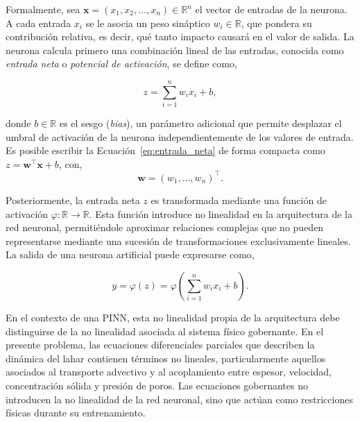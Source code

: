 Formalmente, sea $\mathbf{x} = (x_1, x_2, \dots, x_n) \in \mathbb{R}^n$ el vector de entradas de la neurona. A cada entrada $x_i$ se le asocia un peso sináptico $w_i \in \mathbb{R}$, que pondera su contribución relativa, es decir, qué tanto impacto causará
en el valor de salida. La neurona calcula primero una combinación lineal de las entradas, conocida como \textit{entrada neta} o \textit{potencial de activación}, se define como,

\begin{equation}
    z = \sum_{i=1}^{n} w_i x_i + b,
    \label{eq:entrada_neta}
\end{equation}

\noindent donde $b \in \mathbb{R}$ es el sesgo (\textit{bias}), un parámetro adicional que permite desplazar el umbral de activación de la neurona independientemente de los valores de entrada. Es posible escribir la Ecuación~\eqref{eq:entrada_neta} 
de forma compacta como $z = \mathbf{w}^{\top}\mathbf{x} + b$, con, 
\begin{equation}
    \mathbf{w} = (w_1, \dots, w_n)^{\top}.
    \label{eq:pesos}
\end{equation}

Posteriormente, la entrada neta $z$ es transformada mediante una función de activación $\varphi: \mathbb{R} \rightarrow \mathbb{R}$. Esta función introduce no linealidad en la arquitectura de la red neuronal, permitiéndole aproximar relaciones complejas 
que no pueden representarse mediante una sucesión de transformaciones exclusivamente lineales. La salida de una neurona artificial puede expresarse como,

\begin{equation}
    y = \varphi(z) = \varphi\left(\sum_{i=1}^{n} w_i x_i + b\right).
    \label{eq:salida_neurona}
\end{equation}

En el contexto de una PINN, esta no linealidad propia de la arquitectura debe distinguirse de la no linealidad asociada al sistema físico gobernante. En el presente problema, las ecuaciones diferenciales parciales que describen la 
dinámica del lahar contienen términos no lineales, particularmente aquellos asociados al transporte advectivo y al acoplamiento entre espesor, velocidad, concentración sólida y presión de poros. 
Las ecuaciones gobernantes no introducen la no linealidad de la red neuronal, sino que actúan como restricciones físicas durante su entrenamiento.


